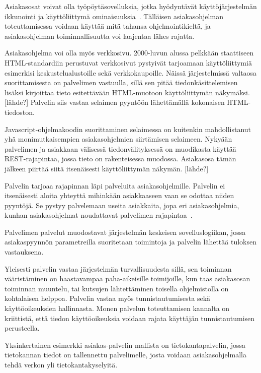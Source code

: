 \documentclass[12pt]{article}
\begin{document}
Asiakasosat voivat olla työpöytäsovelluksia, jotka hyödyntävät käyttöjärjestelmän
ikkunointi ja käyttöliittymä ominaisuuksia~\cite{sinha_client-server_1992}.
Tälläisen asiakasohjelman toteuttamisessa voidaan käyttää mitä tahansa ohjelmointikieltä,
ja asiakasohjelman toiminnallisuutta voi laajentaa lähes rajatta.

Asiakasohjelma voi olla myös verkkosivu. 2000-luvun alussa
pelkkään staattiseen HTML-standardiin perustuvat verkkosivut pystyivät
tarjoamaan käyttöliittymiä esimerkisi keskustelualustoille sekä verkkokaupoille.
Näissä järjestelmissä valtaosa suorittamisesta on palvelimen vastuulla,
sillä sen pitää tiedonkäsittelemisen lisäksi kirjoittaa tieto
esitettävään HTML-muotoon käyttöliittymän näkymäksi.[lähde?] Palvelin
siis vastaa selaimen pyyntöön lähettämällä kokonaisen HTML-tiedoston.

Javascript-ohjelmakoodin suorittaminen selaimessa on kuitenkin mahdollistanut
yhä monimutkaisempien asiakasohjelmien siirtämisen selaimeen.
Nykyään palvelimen ja asiakkaan
välisessä tiedonvälityksessä on muodikasta käyttää REST-rajapintaa, jossa
tieto on rakenteisessa muodossa. Asiakasosa tämän jälkeen piirtää siitä
itsenäisesti käyttöliittymän näkymän. [lähde?]

Palvelin tarjoaa rajapinnan läpi palveluita asiakasohjelmille.
Palvelin ei itsenäisesti aloita yhteyttä mihinkään
asiakkaaseen vaan se odottaa niiden pyyntöjä.
Se pystyy palvelemaan useita asiakkaita, jopa
eri asiakasohjelmia, kunhan asiakasohjelmat noudattavat
palvelimen rajapintaa~\cite{sinha_client-server_1992}.

Palvelimen palvelut muodostavat järjestelmän keskeisen
sovelluslogiikan, jossa asiakaspyynnön parametreilla
suoritetaan toimintoja ja palvelin lähettää
tuloksen vastauksena.

Yleisesti palvelin vastaa järjestelmän turvallisuudesta sillä,
sen toiminnan vääristäminen on haastavampaa paha-aikeisille
toimijoille, kun taas asiakasosan toiminnan muuntelu, tai kutsujen
lähtettäminen toisella ohjelmistolla on kohtalaisen helppoa.
Palvelin vastaa myös tunnistautumisesta sekä käyttöoikeuksien hallinnasta.
Monen palvelun toteuttamisen kannalta on kriittistä, että
tiedon käyttöoikeuksia voidaan rajata käyttäjän tunnistautumisen perusteella.

Yksinkertainen esimerkki asiakas-palvelin mallista on tietokantapalvelin,
jossa tietokannan tiedot on tallennettu palvelimelle, josta voidaan
asiakasohjelmalla tehdä verkon yli tietokantakyselyitä.
\end{document}
